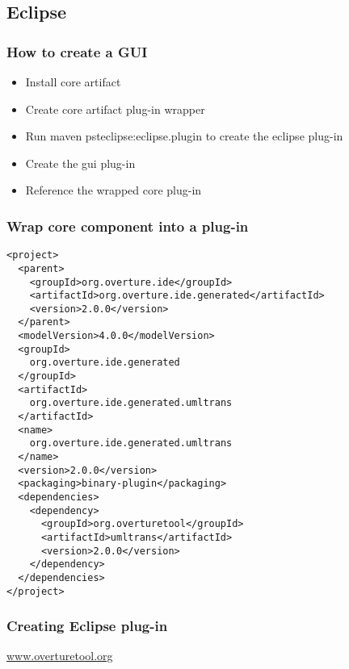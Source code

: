 \subsection{Eclipse}


\frame
{
  \frametitle{How to create a GUI}
\begin{itemize}
	\item Install core artifact
	\item Create core artifact plug-in wrapper
	\item Run maven psteclipse:eclipse.plugin to create the eclipse plug-in
	\item Create the gui plug-in
	\item Reference the wrapped core plug-in
\end{itemize}


}

\begin{frame}[fragile]
  \frametitle{Wrap core component into a plug-in}


\begin{lstlisting}
<project>
  <parent>
    <groupId>org.overture.ide</groupId>
    <artifactId>org.overture.ide.generated</artifactId>
    <version>2.0.0</version>
  </parent>
  <modelVersion>4.0.0</modelVersion>
  <groupId>
    org.overture.ide.generated
  </groupId>
  <artifactId>
    org.overture.ide.generated.umltrans
  </artifactId>
  <name>
    org.overture.ide.generated.umltrans
  </name>
  <version>2.0.0</version>
  <packaging>binary-plugin</packaging>
  <dependencies>
    <dependency>
      <groupId>org.overturetool</groupId>
      <artifactId>umltrans</artifactId>
      <version>2.0.0</version>
    </dependency>
  </dependencies>
</project>
\end{lstlisting}
\end{frame}

\frame
{
  \frametitle{Creating Eclipse plug-in}



}



\begin{frame}[plain,c]
  \begin{center}
	\LARGE {}

	\vspace{2cm}
	\href{www.overturetool.org}{www.overturetool.org}
\end{center}
\end{frame}
